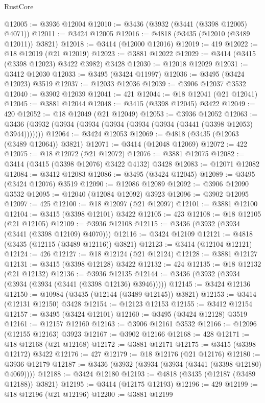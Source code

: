 \begin{lexlean}{RustCore}
\begin{coremodule}
@12005 := @3936 @12004
@12010 := @3436 (@3932 (@3441 (@3398 @12005) @4071))
@12011 := @3424 @12005
@12016 := @4818 (@3435 (@12010 (@3489 @12011)) @3821)
@12018 := @3414 (@12000 @12016)
@12019 := 419
@12022 := @18 @12019 (@21 @12019)
@12023 := @3881 @12022
@12029 := @3414 (@3415 (@3398 @12023) @3422 @3982) @3428
@12030 := @12018 @12029
@12031 := @3412 @12030
@12033 := @3495 (@3424 @11997)
@12036 := @3495 (@3424 @12023) @3519
@12037 := @12033 @12036
@12039 := @3906 @12037 @3532
@12040 := @3902 @12039
@12041 := 421
@12044 := @18 @12041 (@21 @12041)
@12045 := @3881 @12044
@12048 := @3415 (@3398 @12045) @3422
@12049 := 420
@12052 := @18 @12049 (@21 @12049)
@12053 := @3936 @12052
@12063 := @3436 (@3932 (@3934 (@3934 (@3934 (@3934 (@3934 (@3441 (@3398 @12053) @3944)))))))
@12064 := @3424 @12053
@12069 := @4818 (@3435 (@12063 (@3489 @12064)) @3821)
@12071 := @3414 (@12048 @12069)
@12072 := 422
@12075 := @18 @12072 (@21 @12072)
@12076 := @3881 @12075
@12082 := @3414 (@3415 (@3398 @12076) @3422 @4132) @3428
@12083 := @12071 @12082
@12084 := @3412 @12083
@12086 := @3495 (@3424 @12045)
@12089 := @3495 (@3424 @12076) @3519
@12090 := @12086 @12089
@12092 := @3906 @12090 @3532
@12095 := @12040 (@12084 @12092) @3923
@12096 := @3902 @12095
@12097 := 425
@12100 := @18 @12097 (@21 @12097)
@12101 := @3881 @12100
@12104 := @3415 (@3398 @12101) @3422
@12105 := 423
@12108 := @18 @12105 (@21 @12105)
@12109 := @3936 @12108
@12115 := @3436 (@3932 (@3934 (@3441 (@3398 @12109) @4070)))
@12116 := @3424 @12109
@12121 := @4818 (@3435 (@12115 (@3489 @12116)) @3821)
@12123 := @3414 (@12104 @12121)
@12124 := 426
@12127 := @18 @12124 (@21 @12124)
@12128 := @3881 @12127
@12131 := @3415 (@3398 @12128) @3422
@12132 := 424
@12135 := @18 @12132 (@21 @12132)
@12136 := @3936 @12135
@12144 := @3436 (@3932 (@3934 (@3934 (@3934 (@3441 (@3398 @12136) @3946)))))
@12145 := @3424 @12136
@12150 := @10984 (@3435 (@12144 (@3489 @12145)) @3821)
@12153 := @3414 (@12131 @12150) @3428
@12154 := @12123 @12153
@12155 := @3412 @12154
@12157 := @3495 (@3424 @12101)
@12160 := @3495 (@3424 @12128) @3519
@12161 := @12157 @12160
@12163 := @3906 @12161 @3532
@12166 := @12096 (@12155 @12163) @3923
@12167 := @3902 @12166
@12168 := 428
@12171 := @18 @12168 (@21 @12168)
@12172 := @3881 @12171
@12175 := @3415 (@3398 @12172) @3422
@12176 := 427
@12179 := @18 @12176 (@21 @12176)
@12180 := @3936 @12179
@12187 := @3436 (@3932 (@3934 (@3934 (@3441 (@3398 @12180) @4069))))
@12188 := @3424 @12180
@12193 := @4818 (@3435 (@12187 (@3489 @12188)) @3821)
@12195 := @3414 (@12175 @12193)
@12196 := 429
@12199 := @18 @12196 (@21 @12196)
@12200 := @3881 @12199

\end{coremodule}
\end{lexlean}
